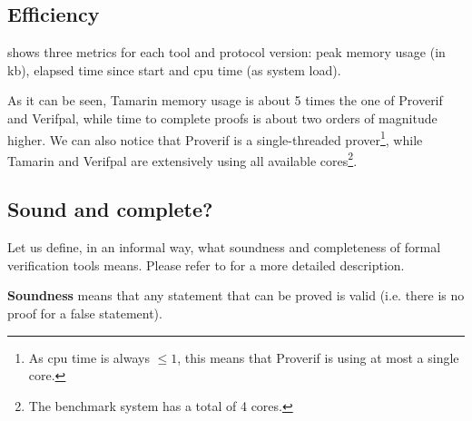 \begin{table}[!ht]
\label{tbl:expressiveness}
\caption{Expressiveness of tools.}
\renewcommand{\arraystretch}{1.5}
\setlength\arrayrulewidth{1pt}
\end{table}

\subsection{Efficiency}
 shows three metrics for each tool and protocol version: peak memory usage (in kb), elapsed time since start and cpu time (as system load). 

As it can be seen, Tamarin memory usage is about 5 times the one of Proverif and Verifpal, while time to complete proofs is about two orders of magnitude higher. We can also notice that Proverif is a single-threaded prover\footnote{As cpu time is always $\leq 1$, this means that Proverif is using at most a single core.}, while Tamarin and Verifpal are extensively using all available cores\footnote{The benchmark system has a total of 4 cores.}.




\subsection{Sound and complete?}

Let us define, in an informal way, what soundness and completeness of formal verification tools means. Please refer to \cite{Furer89oncompleteness} for a more detailed description.

\textbf{Soundness} means that any statement that can be proved is valid (i.e. there is no proof for a false statement).

